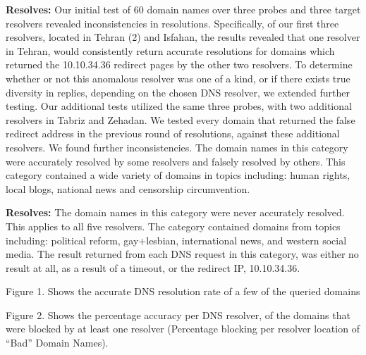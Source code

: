 \textbf{ Resolves:} Our initial test of 60 domain names over three probes and three target resolvers revealed inconsistencies in resolutions. Specifically, of our first three resolvers, located in Tehran (2) and Isfahan, the results revealed that one resolver in Tehran, would consistently return accurate resolutions for domains which returned the 10.10.34.36 redirect pages by the other two resolvers. To determine whether or not this anomalous resolver was one of a kind, or if there exists true diversity in replies, depending on the chosen DNS resolver, we extended further testing. Our additional tests utilized the same three probes, with two additional resolvers in Tabriz and Zehadan. We tested every domain that returned the false redirect address in the previous round of resolutions, against these additional resolvers. We found further inconsistencies. The domain names in this category were accurately resolved by some resolvers and falsely resolved by others. This category contained a wide variety of domains in topics including: human rights, local blogs, national news and censorship circumvention.

\textbf{ Resolves:} The domain names in this category were never accurately resolved. This applies to all five resolvers. The category contained domains from topics including: political reform, gay+lesbian, international news, and western social media. The result returned from each DNS request in this category, was either no result at all, as a result of a timeout, or the redirect IP, 10.10.34.36.

Figure 1. Shows the accurate DNS resolution rate of a few of the queried domains


Figure 2. Shows the percentage accuracy per DNS resolver, of the domains that were blocked by at least one resolver (Percentage blocking per resolver location of “Bad” Domain Names).
